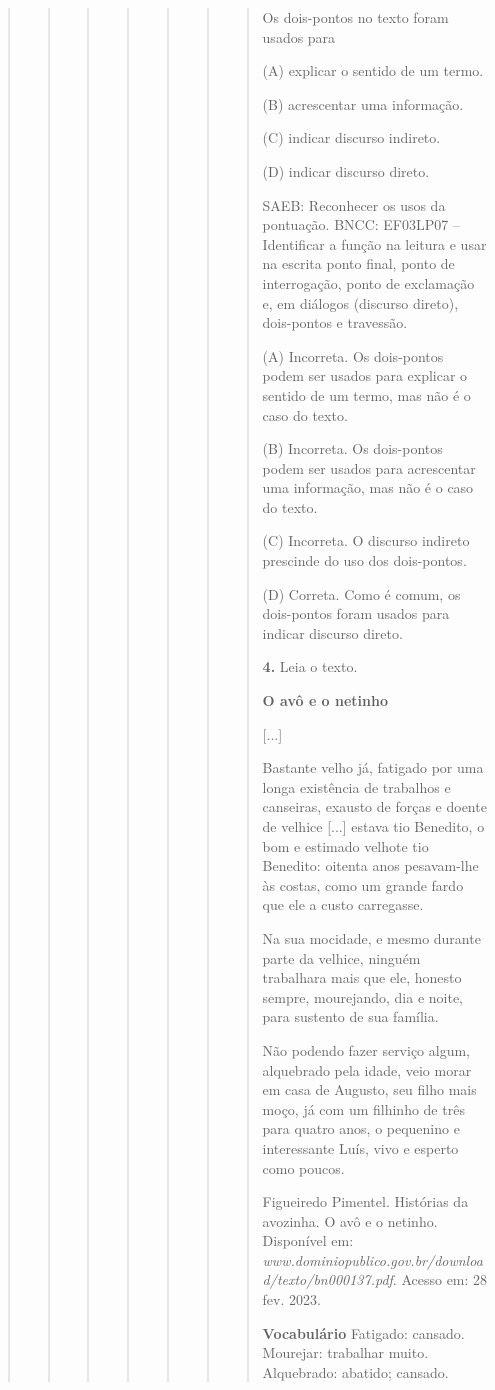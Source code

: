 \begin{boxlist}
{{\begin{quote}
\begin{quote}
\begin{quote}
{\begin{quote}
{\begin{quote}
\begin{quote}
\begin{quote}

Os dois-pontos no texto foram usados para

(A) explicar o sentido de um termo.

(B) acrescentar uma informação.

(C) indicar discurso indireto.

(D) indicar discurso direto.

SAEB: Reconhecer os usos da pontuação.
BNCC: EF03LP07 -- Identificar a função na leitura e usar na escrita ponto final, ponto
de interrogação, ponto de exclamação e, em diálogos (discurso direto), dois-pontos e
travessão.  

(A) Incorreta. Os dois-pontos podem ser usados para explicar o sentido de um termo, mas não é o caso do texto.

(B) Incorreta. Os dois-pontos podem ser usados para acrescentar uma informação, mas não é o caso do texto.

(C) Incorreta. O discurso indireto prescinde do uso dos dois-pontos.

(D) Correta. Como é comum, os dois-pontos foram usados para indicar discurso direto.

\textbf{4.} Leia o texto.

\textbf{O avô e o netinho}

{[}...{]}

Bastante velho já, fatigado por uma longa existência de trabalhos e
canseiras, exausto de forças e doente de velhice {[}...{]} estava tio Benedito, o bom e estimado velhote tio
Benedito: oitenta anos pesavam-lhe às costas, como um grande fardo que
ele a custo carregasse.

Na sua mocidade, e mesmo durante parte da velhice, ninguém trabalhara
mais que ele, honesto sempre, mourejando, dia e noite, para sustento de
sua família.

Não podendo fazer serviço algum, alquebrado pela idade, veio morar em
casa de Augusto, seu filho mais moço, já com um filhinho de três para
quatro anos, o pequenino e interessante Luís, vivo e esperto como
poucos.

Figueiredo Pimentel. Histórias da avozinha. O avô e o netinho. Disponível em:
\emph{www.dominiopublico.gov.br/download/texto/bn000137.pdf}. Acesso em: 28
fev. 2023.

\textbf{Vocabulário}
Fatigado: cansado.
Mourejar: trabalhar muito.
Alquebrado: abatido; cansado.


\end{quote}
\end{quote}
\end{quote}}
\end{quote}}
\end{quote}
\end{quote}
\end{quote}}}
\end{boxlist}
